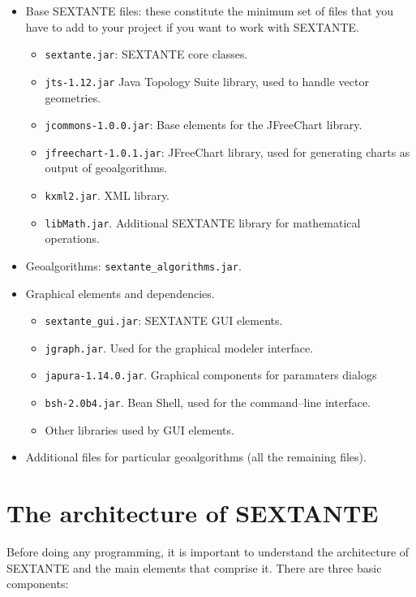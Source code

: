 \begin{itemize}
 \item Base SEXTANTE files: these constitute the minimum set of files that you have to add to your project if you want to work with SEXTANTE.
\begin{itemize}
\item \texttt{sextante.jar}: SEXTANTE core classes.
\item \texttt{jts-1.12.jar} Java Topology Suite library, used to handle vector geometries.
\item \texttt{jcommons-1.0.0.jar}: Base elements for the JFreeChart library.
\item \texttt{jfreechart-1.0.1.jar}: JFreeChart library, used for generating charts as output of geoalgorithms.
\item \texttt{kxml2.jar}. XML library.
\item \texttt{libMath.jar}. Additional SEXTANTE library for mathematical operations.
\end{itemize}

\item Geoalgorithms: \texttt{sextante\_algorithms.jar}.

\item Graphical elements and dependencies.
\begin{itemize}
\item \texttt{sextante\_gui.jar}: SEXTANTE GUI elements.
\item \texttt{jgraph.jar}. Used for the graphical modeler interface.
\item \texttt{japura-1.14.0.jar}. Graphical components for paramaters dialogs
\item \texttt{bsh-2.0b4.jar}. Bean Shell, used for the command--line interface.
\item Other libraries used by GUI elements.
\end{itemize}

\item Additional files for particular geoalgorithms (all the remaining files).

\end{itemize}

\section{The architecture of SEXTANTE}

Before doing any programming, it is important to understand the architecture of SEXTANTE and the main elements that comprise it. There are three basic components:

